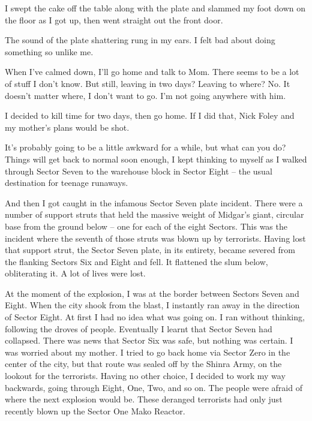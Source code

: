 \documentclass[oneside]{book}
\begin{document}
I swept the cake off the table along with the plate and slammed my foot down on the floor as I got up, then went straight out the front door.

The sound of the plate shattering rung in my ears. I felt bad about doing something so unlike me.

When I’ve calmed down, I’ll go home and talk to Mom. There seems to be a lot of stuff I don’t know. But still, leaving in two days? Leaving to where? No. It doesn’t matter where, I don’t want to go. I’m not going anywhere with him.

I decided to kill time for two days, then go home. If I did that, Nick Foley and my mother’s plans would be shot.

It’s probably going to be a little awkward for a while, but what can you do? Things will get back to normal soon enough, I kept thinking to myself as I walked through Sector Seven to the warehouse block in Sector Eight – the usual destination for teenage runaways.

And then I got caught in the infamous Sector Seven plate incident. There were a number of support struts that held the massive weight of Midgar’s giant, circular base from the ground below – one for each of the eight Sectors. This was the incident where the seventh of those struts was blown up by terrorists. Having lost that support strut, the Sector Seven plate, in its entirety, became severed from the flanking Sectors Six and Eight and fell. It flattened the slum below, obliterating it. A lot of lives were lost.

At the moment of the explosion, I was at the border between Sectors Seven and Eight. When the city shook from the blast, I instantly ran away in the direction of Sector Eight. At first I had no idea what was going on. I ran without thinking, following the droves of people. Eventually I learnt that Sector Seven had collapsed. There was news that Sector Six was safe, but nothing was certain. I was worried about my mother. I tried to go back home via Sector Zero in the center of the city, but that route was sealed off by the Shinra Army, on the lookout for the terrorists. Having no other choice, I decided to work my way backwards, going through Eight, One, Two, and so on. The people were afraid of where the next explosion would be. These deranged terrorists had only just recently blown up the Sector One Mako Reactor.
\end{document}
